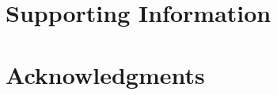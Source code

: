 \documentclass[10pt,letterpaper]{article}
\begin{document}
\section*{Supporting Information}


\section*{Acknowledgments}

\nolinenumbers

%
%
% 




%

\end{document}
